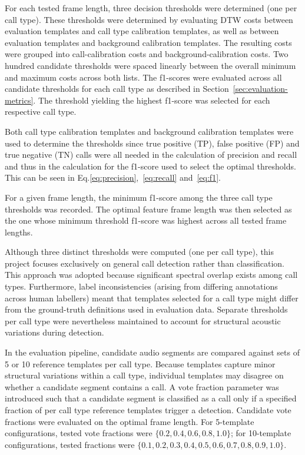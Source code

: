 For each tested frame length, three decision thresholds were determined (one per call type). These thresholds were determined by evaluating \ac{DTW} costs between 
evaluation templates and call type calibration templates, as well as between evaluation templates and background calibration templates. The resulting costs were grouped 
into call-calibration costs and background-calibration costs. Two hundred candidate thresholds were spaced linearly between the overall minimum and maximum 
costs across both lists. The f1-scores were evaluated across all candidate thresholds for each call type as described in Section~\ref{sec:evaluation-metrics}. The 
threshold yielding the highest f1-score was selected for each respective call type.

Both call type calibration templates and background calibration templates were used to determine the thresholds since true positive (\acs{TP}), false positive (\acs{FP}) 
and true negative (\acs{TN}) calls were all needed 
in the calculation of precision and recall and thus in the calculation for the f1-score used to select the optimal thresholds. 
This can be seen in Eq.\ref{eq:precision},~\ref{eq:recall} and~\ref{eq:f1}.

For a given frame length, the minimum f1-score among the three call type thresholds was recorded. The optimal feature frame length was then selected as the one 
whose minimum threshold f1-score was highest across all tested frame lengths.

Although three distinct thresholds were computed (one per call type), this project focuses exclusively on general call detection rather than classification. 
This approach was adopted because significant spectral overlap exists among call types. Furthermore, label inconsistencies (arising from differing annotations 
across human labellers) meant that templates selected for a call type might differ from the ground-truth definitions used in evaluation data. Separate thresholds 
per call type were nevertheless maintained to account for structural acoustic variations during detection.

In the evaluation pipeline, candidate audio segments are compared against sets of 5 or 10 reference templates per call type. Because templates capture minor structural 
variations within a call type, individual templates may disagree on whether a candidate segment contains a call. A vote fraction parameter was introduced 
such that a candidate segment is classified as a call only if a specified fraction of per call type reference templates trigger a detection. Candidate vote fractions 
were evaluated on the optimal frame length. For 5-template configurations, tested vote fractions were $\{0.2, 0.4, 0.6, 0.8, 1.0\}$; for 10-template 
configurations, tested fractions were $\{0.1, 0.2, 0.3, 0.4, 0.5, 0.6, 0.7, 0.8, 0.9, 1.0\}$. 

